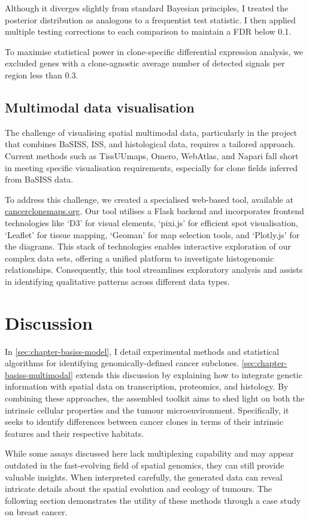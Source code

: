 Although it diverges slightly from standard Bayesian principles, I treated the posterior distribution as analogous to a frequentist test statistic. I then applied multiple testing corrections to each comparison to maintain a \acf{FDR} below 0.1.

To maximise statistical power in clone-specific differential expression analysis, we excluded genes with a clone-agnostic average number of detected signals per region less than 0.3.

\subsection{Multimodal data visualisation}

The challenge of visualising spatial multimodal data, particularly in the project that combines \ac{BaSISS}, \ac{ISS}, and histological data, requires a tailored approach. Current methods such as \ac{TissUUmaps}, \ac{Omero}, \ac{WebAtlas}, and \ac{Napari} fall short in meeting specific visualisation requirements, especially for clone fields inferred from \ac{BaSISS} data.

To address this challenge, we created a specialised web-based tool, available at \href{https://www.cancerclonemaps.org/}{cancerclonemaps.org}. Our tool utilises a Flask backend and incorporates frontend technologies like `D3' for visual elements, `pixi.js' for efficient spot visualisation, `Leaflet' for tissue mapping, `Geoman' for map selection tools, and `Plotly.js' for the diagrams. This stack of technologies enables interactive exploration of our complex data sets, offering a unified platform to investigate histogenomic relationships. Consequently, this tool streamlines exploratory analysis and assists in identifying qualitative patterns across different data types.

\section{Discussion}

In \cref{sec:chapter-basiss-model}, I detail experimental methods and statistical algorithms for identifying genomically-defined cancer subclones. \cref{sec:chapter-basiss-multimodal} extends this discussion by explaining how to integrate genetic information with spatial data on transcription, proteomics, and histology. By combining these approaches, the assembled toolkit aims to shed light on both the intrinsic cellular properties and the tumour microenvironment. Specifically, it seeks to identify differences between cancer clones in terms of their intrinsic features and their respective habitats.

While some assays discussed here lack multiplexing capability and may appear outdated in the fast-evolving field of spatial genomics, they can still provide valuable insights. When interpreted carefully, the generated data can reveal intricate details about the spatial evolution and ecology of tumours. The following section  demonstrates the utility of these methods through a case study on breast cancer.